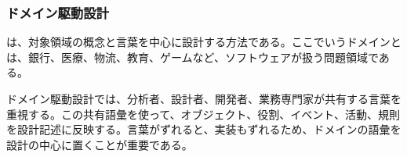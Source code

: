 \subsubsection{ドメイン駆動設計}

 は、対象領域の概念と言葉を中心に設計する方法である。ここでいうドメインとは、銀行、医療、物流、教育、ゲームなど、ソフトウェアが扱う問題領域である。

ドメイン駆動設計では、分析者、設計者、開発者、業務専門家が共有する言葉を重視する。この共有語彙を使って、オブジェクト、役割、イベント、活動、規則を設計記述に反映する。言葉がずれると、実装もずれるため、ドメインの語彙を設計の中心に置くことが重要である。
